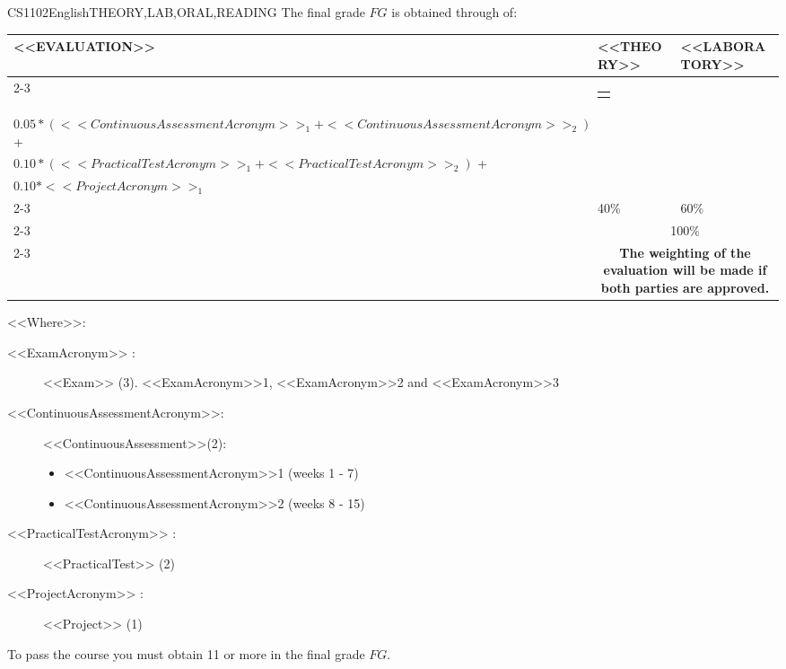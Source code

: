   \begin{evaluation}{CS1102}{English}{THEORY,LAB,ORAL,READING}
  The final grade $FG$ is obtained through of:
 
  \begin{tabularx}{0.9\textwidth}{|X|p{}|p{}|} \hline
  \multirow{4}{*}{\uppercase{<<Evaluation>>}} & \uppercase{<<Theory>>} & \uppercase{<<Laboratory>>} \\ \cline{2-3}
  & %
      \begin{minipage}{0.95\textwidth}
      \begin{tabular}{l}
          $0.40*<<ExamAcronym>>_{1}$
          \end{tabular} 
      \end{minipage} 
  & %
      \begin{minipage}{0.95\textwidth}
      \begin{tabular}{l}
        $0.10*(<<ExamAcronym>>_{2} + <<ExamAcronym>>_{3})$ + \\
        $0.05*(<<ContinuousAssessmentAcronym>>_{1} + <<ContinuousAssessmentAcronym>>_{2})$ + \\
        $0.10*(<<PracticalTestAcronym>>_{1} + <<PracticalTestAcronym>>_{2})$ + \\
        $0.10*<<ProjectAcronym>>_{1}$
      \end{tabular} 
      \end{minipage}                 \\ \cline{2-3}
  
  & %
  40\% 
  & %
  60\% \\ \cline{2-3}
  & \multicolumn{2}{c|}{100\%}  \\ \cline{2-3}
  & \multicolumn{2}{c|}{\textbf{The weighting of the evaluation will be made if both parties are approved.}}  \\ \hline
  \end{tabularx}
    
  \vspace{2mm}
  \noindent <<Where>>:
  \begin{description}
      \item[<<ExamAcronym>> :] <<Exam>> (3). <<ExamAcronym>>1, <<ExamAcronym>>2 and <<ExamAcronym>>3 
      \item[<<ContinuousAssessmentAcronym>>:]<<ContinuousAssessment>>(2):
      \begin{itemize}
              \item <<ContinuousAssessmentAcronym>>1 (weeks 1 - 7) 
              \item <<ContinuousAssessmentAcronym>>2 (weeks 8 - 15)
      \end{itemize}
      \item[<<PracticalTestAcronym>> :] <<PracticalTest>>  (2)
      \item[<<ProjectAcronym>> :] <<Project>> (1)
  \end{description}
  
  \noindent To pass the course you must obtain 11 or more in the final grade $FG$.
  \end{evaluation}
 
